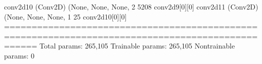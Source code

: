 \documentclass[letterpaper,10pt,english]{sphinxmanual}
\begin{document}
\begin{sphinxVerbatim}[commandchars=\\\{\}]
conv2d\PYGZus{}10 (Conv2D)              (None, None, None, 2 5208        conv2d\PYGZus{}9[0][0]                   
\PYGZus{}\PYGZus{}\PYGZus{}\PYGZus{}\PYGZus{}\PYGZus{}\PYGZus{}\PYGZus{}\PYGZus{}\PYGZus{}\PYGZus{}\PYGZus{}\PYGZus{}\PYGZus{}\PYGZus{}\PYGZus{}\PYGZus{}\PYGZus{}\PYGZus{}\PYGZus{}\PYGZus{}\PYGZus{}\PYGZus{}\PYGZus{}\PYGZus{}\PYGZus{}\PYGZus{}\PYGZus{}\PYGZus{}\PYGZus{}\PYGZus{}\PYGZus{}\PYGZus{}\PYGZus{}\PYGZus{}\PYGZus{}\PYGZus{}\PYGZus{}\PYGZus{}\PYGZus{}\PYGZus{}\PYGZus{}\PYGZus{}\PYGZus{}\PYGZus{}\PYGZus{}\PYGZus{}\PYGZus{}\PYGZus{}\PYGZus{}\PYGZus{}\PYGZus{}\PYGZus{}\PYGZus{}\PYGZus{}\PYGZus{}\PYGZus{}\PYGZus{}\PYGZus{}\PYGZus{}\PYGZus{}\PYGZus{}\PYGZus{}\PYGZus{}\PYGZus{}\PYGZus{}\PYGZus{}\PYGZus{}\PYGZus{}\PYGZus{}\PYGZus{}\PYGZus{}\PYGZus{}\PYGZus{}\PYGZus{}\PYGZus{}\PYGZus{}\PYGZus{}\PYGZus{}\PYGZus{}\PYGZus{}\PYGZus{}\PYGZus{}\PYGZus{}\PYGZus{}\PYGZus{}\PYGZus{}\PYGZus{}\PYGZus{}\PYGZus{}\PYGZus{}\PYGZus{}\PYGZus{}\PYGZus{}\PYGZus{}\PYGZus{}\PYGZus{}\PYGZus{}
conv2d\PYGZus{}11 (Conv2D)              (None, None, None, 1 25          conv2d\PYGZus{}10[0][0]                  
==================================================================================================
Total params: 265,105
Trainable params: 265,105
Non\PYGZhy{}trainable params: 0
\PYGZus{}\PYGZus{}\PYGZus{}\PYGZus{}\PYGZus{}\PYGZus{}\PYGZus{}\PYGZus{}\PYGZus{}\PYGZus{}\PYGZus{}\PYGZus{}\PYGZus{}\PYGZus{}\PYGZus{}\PYGZus{}\PYGZus{}\PYGZus{}\PYGZus{}\PYGZus{}\PYGZus{}\PYGZus{}\PYGZus{}\PYGZus{}\PYGZus{}\PYGZus{}\PYGZus{}\PYGZus{}\PYGZus{}\PYGZus{}\PYGZus{}\PYGZus{}\PYGZus{}\PYGZus{}\PYGZus{}\PYGZus{}\PYGZus{}\PYGZus{}\PYGZus{}\PYGZus{}\PYGZus{}\PYGZus{}\PYGZus{}\PYGZus{}\PYGZus{}\PYGZus{}\PYGZus{}\PYGZus{}\PYGZus{}\PYGZus{}\PYGZus{}\PYGZus{}\PYGZus{}\PYGZus{}\PYGZus{}\PYGZus{}\PYGZus{}\PYGZus{}\PYGZus{}\PYGZus{}\PYGZus{}\PYGZus{}\PYGZus{}\PYGZus{}\PYGZus{}\PYGZus{}\PYGZus{}\PYGZus{}\PYGZus{}\PYGZus{}\PYGZus{}\PYGZus{}\PYGZus{}\PYGZus{}\PYGZus{}\PYGZus{}\PYGZus{}\PYGZus{}\PYGZus{}\PYGZus{}\PYGZus{}\PYGZus{}\PYGZus{}\PYGZus{}\PYGZus{}\PYGZus{}\PYGZus{}\PYGZus{}\PYGZus{}\PYGZus{}\PYGZus{}\PYGZus{}\PYGZus{}\PYGZus{}\PYGZus{}\PYGZus{}\PYGZus{}\PYGZus{}
\end{sphinxVerbatim}
\end{document}
